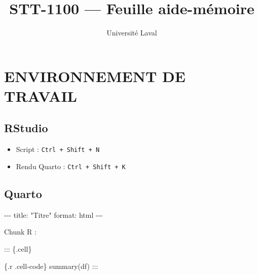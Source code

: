 \documentclass[
  8pt,
  letterpaper,
  DIV=11,
  numbers=noendperiod]{scrartcl}
\title{STT-1100 --- Feuille aide-mémoire}
\author{Université Laval}
\date{}
\newenvironment{Shaded}{\begin{snugshade}}{\end{snugshade}}
\newcommand{\AnnotationTok}[1]{\textcolor[rgb]{0.37,0.37,0.37}{#1}}
\newcommand{\AttributeTok}[1]{\textcolor[rgb]{0.40,0.45,0.13}{#1}}
\newcommand{\CommentTok}[1]{\textcolor[rgb]{0.37,0.37,0.37}{#1}}
\newcommand{\ConstantTok}[1]{\textcolor[rgb]{0.56,0.35,0.01}{#1}}
\newcommand{\FunctionTok}[1]{\textcolor[rgb]{0.28,0.35,0.67}{#1}}
\newcommand{\NormalTok}[1]{\textcolor[rgb]{0.00,0.23,0.31}{#1}}
\newcommand{\SpecialCharTok}[1]{\textcolor[rgb]{0.37,0.37,0.37}{#1}}
\newcommand{\StringTok}[1]{\textcolor[rgb]{0.13,0.47,0.30}{#1}}
\providecommand{\tightlist}{%
  \setlength{\itemsep}{0pt}\setlength{\parskip}{0pt}}
\begin{document}
\maketitle


\begin{Shaded}
\end{Shaded}

\section{ENVIRONNEMENT DE TRAVAIL}\label{environnement-de-travail}

\subsection{RStudio}\label{rstudio}

\begin{itemize}
\tightlist
\item
  Script : \texttt{Ctrl\ +\ Shift\ +\ N}
\item
  Rendu Quarto : \texttt{Ctrl\ +\ Shift\ +\ K}
\end{itemize}

\subsection{Quarto}\label{quarto}

\begin{Shaded}
\begin{Highlighting}[]
\CommentTok{{-}{-}{-}}
\AnnotationTok{title:}\CommentTok{ "Titre"}
\AnnotationTok{format:}\CommentTok{ html}
\CommentTok{{-}{-}{-}}
\end{Highlighting}
\end{Shaded}

Chunk R :

\begin{Shaded}
\begin{Highlighting}[]

\SpecialCharTok{:::}\NormalTok{ \{.cell\}}

\StringTok{\textasciigrave{}\textasciigrave{}\textasciigrave{}}\AttributeTok{\{.r .cell{-}code\}}
\AttributeTok{summary(df)}
\StringTok{\textasciigrave{}\textasciigrave{}\textasciigrave{}}
\SpecialCharTok{:::}
\end{Highlighting}
\end{Shaded}
\end{document}

